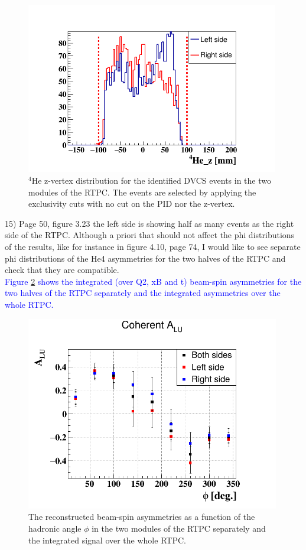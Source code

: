 \begin{figure}[h!]
\centering
\includegraphics[height=7.5cm]{fig/dvcs_z_vertex.png}
\caption{$^{4}$He z-vertex distribution for the identified DVCS events in the 
two modules of the RTPC. The events are selected by applying the exclusivity 
cuts with no cut on the PID nor the z-vertex.}
\label{fig:coh_z_vertex}
 \end{figure}




15) Page 50, figure 3.23 the left side is showing half as many events as the 
right side of the RTPC. Although a priori that should not affect the phi 
distributions of the results, like for instance in figure 4.10, page 74, I 
would like to see separate phi distributions of the He4 asymmetries for the two 
halves of the RTPC and check that they are compatible.\\

\textcolor{blue}{Figure \ref{fig:coherent_alu_sides} shows the integrated (over 
Q2, xB and t) beam-spin asymmetries for the two halves of the RTPC separately 
and the integrated asymmetries over the whole RTPC.  }\\
\begin{figure}[h!]
\centering
\includegraphics[height=8.5cm]{fig/BSA_Coherent_sides.png}
\caption{The reconstructed beam-spin asymmetries as a function of the hadronic 
angle $\phi$ in the two modules of the RTPC separately and the integrated 
signal over the whole RTPC.}
\label{fig:coherent_alu_sides}
 \end{figure}


